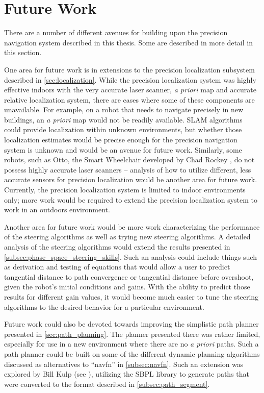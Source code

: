 \section{Future Work}\label{sec:future_work}

There are a number of different avenues for building upon the precision navigation system described in this thesis. Some are described in more detail in this section.

One area for future work is in extensions to the precision localization subsystem described in \autoref{sec:localization}. While the precision localization system was highly effective indoors with the very accurate laser scanner, \emph{a priori} map and accurate relative localization system, there are cases where some of these components are unavailable. For example, on a robot that needs to navigate precisely in new buildings, an \emph{a priori} map would not be readily available. SLAM algorithms could provide localization within unknown environments, but whether those localization estimates would be precise enough for the precision navigation system is unknown and would be an avenue for future work. Similarly, some robots, such as Otto, the Smart Wheelchair developed by Chad Rockey , do not possess highly accurate laser scanners -- analysis of how to utilize different, less accurate sensors for precision localization would be another area for future work. Currently, the precision localization system is limited to indoor environments only; more work would be required to extend the precision localization system to work in an outdoors environment.

Another area for future work would be more work characterizing the performance of the steering algorithms as well as trying new steering algorithms. A detailed analysis of the steering algorithms would extend the results presented in \autoref{subsec:phase_space_steering_skills}. Such an analysis could include things such as derivation and testing of equations that would allow a user to predict tangential distance to path convergence or tangential distance before overshoot, given the robot's initial conditions and gains. With the ability to predict those results for different gain values, it would become much easier to tune the steering algorithms to the desired behavior for a particular environment.

Future work could also be devoted towards improving the simplistic path planner presented in \autoref{sec:path_planning}. The planner presented there was rather limited, especially for use in a new environment where there are no \emph{a priori} paths. Such a path planner could be built on some of the different dynamic planning algorithms discussed as alternatives to ``navfn'' in \autoref{subsec:navfn}. Such an extension was explored by Bill Kulp (see ), utilizing the SBPL library  to generate paths that were converted to the format described in \autoref{subsec:path_segment}.


